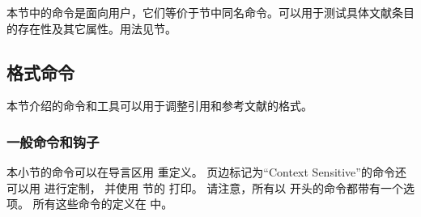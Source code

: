 本节中的命令是面向用户，它们等价于节中同名命令。可以用于测试具体文献条目的存在性及其它属性。用法见节。

\begin{ltxsyntax}
\end{ltxsyntax}


\subsection{格式命令}%
\label{use:fmt}


本节介绍的命令和工具可以用于调整引用和参考文献的格式。

\subsubsection{一般命令和钩子} %
\label{use:fmt:fmt}


本小节的命令可以在导言区用  重定义。
页边标记为“Context Sensitive”的命令还可以用  进行定制，
并使用  节的  打印。
请注意，所有以  开头的命令都带有一个选项。
所有这些命令的定义在  中。

